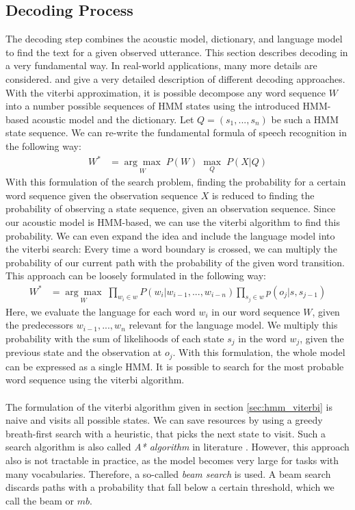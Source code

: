 \subsection{Decoding Process}
The decoding step combines the acoustic model, dictionary, and language model to find the text for a given observed utterance. This section describes decoding in a very fundamental way. In real-world applications, many more details are considered. \cite{huang2001spoken} and \cite{yu2016automatic} give a very detailed description of different decoding approaches.\\
With the viterbi approximation, it is possible decompose any word sequence $W$ into a number possible sequences of HMM states using the introduced HMM-based acoustic model and the dictionary. Let $Q = (s_1, ..., s_n)$ be such a HMM state sequence. We can re-write the fundamental formula of speech recognition in the following way: 
\begin{align}
W^* &= \underset{W}{\arg \max} \; P(W) \; \underset{Q}{\max} \; P(X|Q)
\label{eq:viterbi_assumption}
\end{align}
With this formulation of the search problem, finding the probability for a certain word sequence given the observation sequence $X$ is reduced to finding the probability of observing a state sequence, given an observation sequence. Since our acoustic model is HMM-based, we can use the viterbi algorithm to find this probability. We can even expand the idea and include the language model into the viterbi search: Every time a word boundary is crossed, we can multiply the probability of our current path with the probability of the given word transition. This approach can be loosely formulated in the following way: 
\begin{align*}
W^* &= \underset{W}{\arg \max} \; \prod_{w_i \in w} P(w_i|w_{i - 1},...,w_{i - n}) \prod_{s_j \in w} p(o_j | s, s_{j - 1})
\end{align*}
Here, we evaluate the language for each word $w_i$ in our word sequence $W$, given the predecessors $w_{i - 1},...,w_n$ relevant for the language model. We multiply this probability with the sum of likelihoods of each state $s_j$ in the word $w_j$, given the previous state and the observation at $o_j$. With this formulation, the whole model can be expressed as a single HMM. It is possible to search for the most probable word sequence using the viterbi algorithm. \\ \\ 
The formulation of the viterbi algorithm given in section \ref{sec:hmm_viterbi} is naive and visits all possible states. We can save resources by using a greedy breath-first search with a heuristic, that picks the next state to visit. Such a search algorithm is also called \textit{A* algorithm} in literature \cite{hart1968formal}. However, this approach also is not tractable in practice, as the model becomes very large for tasks with many vocabularies. Therefore, a so-called \textit{beam search} is used. A beam search discards paths with a probability that fall below a certain threshold, which we call the beam or $mb$. \\ \\
